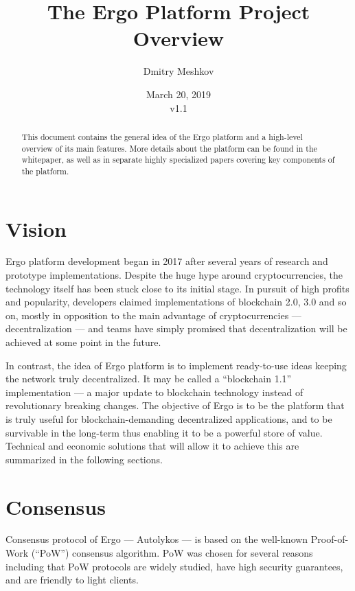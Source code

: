 \documentclass[]{article}
\begin{document}
    \title{The Ergo Platform Project Overview}
    \author{Dmitry Meshkov}

    \date{March 20, 2019\\v1.1}

    \maketitle

    \begin{abstract}
        This document contains the general idea of the Ergo platform and a high-level overview of its main
        features. More details about the platform can be found in the whitepaper, as well as in
        separate highly specialized papers covering key components of the platform.
    \end{abstract}

    \section{Vision}

    Ergo platform development began in 2017 after several years of research and prototype
    implementations. Despite the huge hype around cryptocurrencies, the technology itself has
    been stuck close to its initial stage. In pursuit of high profits and popularity, developers claimed
    implementations of blockchain 2.0, 3.0 and so on, mostly in opposition to the main advantage of
    cryptocurrencies --- decentralization --- and teams have simply promised that decentralization will
    be achieved at some point in the future.

    In contrast, the idea of Ergo platform is to implement ready-to-use ideas keeping the network
    truly decentralized. It may be called a ``blockchain 1.1'' implementation --- a major update to
    blockchain technology instead of revolutionary breaking changes. The objective of Ergo is to be
    the platform that is truly useful for blockchain-demanding decentralized applications, and to be
    survivable in the long-term thus enabling it to be a powerful store of value. Technical and economic
    solutions that will allow it to achieve this are summarized in the following sections.

    \section{Consensus}

    Consensus protocol of Ergo --- Autolykos --- is based on the well-known
    Proof-of-Work (``PoW'')
    consensus algorithm. PoW was chosen for several reasons including that PoW protocols are widely
    studied, have high security guarantees, and are friendly to light clients.
\end{document}
